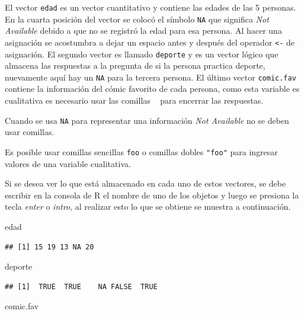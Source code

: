 \documentclass[10pt,]{krantz}
\makeatletter
\newenvironment{Shaded}{\begin{snugshade}}{\end{snugshade}}
\newcommand{\NormalTok}[1]{{#1}}
\let\proglang=\textsf
\newenvironment{kframe}{%
\medskip{}
\setlength{\fboxsep}{.8em}
 \def\at@end@of@kframe{}%
 \ifinner\ifhmode%
  \def\at@end@of@kframe{\end{minipage}}%
  \begin{minipage}{\columnwidth}%
 \fi\fi%
 \def\FrameCommand##1{\hskip\@totalleftmargin \hskip-\fboxsep
 \colorbox{shadecolor}{##1}\hskip-\fboxsep
     \hskip-\linewidth \hskip-\@totalleftmargin \hskip\columnwidth}%
 \MakeFramed {\advance\hsize-\width
   \@totalleftmargin\z@ \linewidth\hsize
   \@setminipage}}%
 {\par\unskip\endMakeFramed%
 \at@end@of@kframe}
\renewenvironment{Shaded}{\begin{kframe}}{\end{kframe}}
\let\BeginKnitrBlock\begin \let\EndKnitrBlock\end
\makeatother
\begin{document}
El vector \texttt{edad} es un vector cuantitativo y contiene las edades
de las 5 personas. En la cuarta posición del vector se colocó el símbolo
\texttt{NA} que significa \textit{Not Available} debido a que no se
registró la edad para esa persona. Al hacer una asignación se acostumbra
a dejar un espacio antes y después del operador \texttt{\textless{}-} de
asignación. El segundo vector es llamado \texttt{deporte} y es un vector
lógico que almacena las respuestas a la pregunta de si la persona
practica deporte, nuevamente aquí hay un \texttt{NA} para la tercera
persona. El último vector \texttt{comic.fav} contiene la información del
cómic favorito de cada persona, como esta variable es cualitativa es
necesario usar las comillas
\texttt{\textquotesingle{}\ \textquotesingle{}} para encerrar las
respuestas.

\BeginKnitrBlock{rmdwarning}
Cuando se usa \texttt{NA} para representar una información
\textit{Not Available} no se deben usar comillas.
\EndKnitrBlock{rmdwarning}

\BeginKnitrBlock{rmdnote}
Es posible usar comillas sencillas
\texttt{\textquotesingle{}foo\textquotesingle{}} o comillas dobles
\texttt{"foo"} para ingresar valores de una variable cualitativa.
\EndKnitrBlock{rmdnote}

Si se desea ver lo que está almacenado en cada uno de estos vectores, se
debe escribir en la consola de \proglang{R} el nombre de uno de los
objetos y luego se presiona la tecla \textit{enter} o \textit{intro}, al
realizar esto lo que se obtiene se muestra a continuación.

\begin{Shaded}
\begin{Highlighting}[]
\NormalTok{edad}
\end{Highlighting}
\end{Shaded}

\begin{verbatim}
## [1] 15 19 13 NA 20
\end{verbatim}

\begin{Shaded}
\begin{Highlighting}[]
\NormalTok{deporte}
\end{Highlighting}
\end{Shaded}

\begin{verbatim}
## [1]  TRUE  TRUE    NA FALSE  TRUE
\end{verbatim}

\begin{Shaded}
\begin{Highlighting}[]
\NormalTok{comic.fav}
\end{Highlighting}
\end{Shaded}
\end{document}
